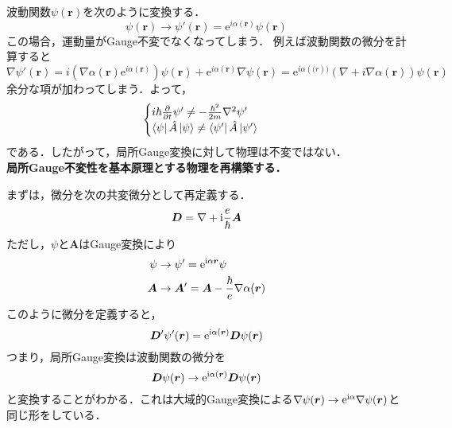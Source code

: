 \documentclass{report}
\begin{document}
  波動関数$\psi(\bm{r})$を次のように変換する．
  \begin{equation}
    \psi(\bm{r})\to\psi'(\bm{r})=\mathrm{e}^{i\alpha(\bm{r})}\psi(\bm{r})
  \end{equation}
  この場合，運動量がGauge不変でなくなってしまう．
  例えば波動関数の微分を計算すると
  \begin{equation}
    \nabla\psi'(\bm{r})=i(\nabla\alpha(\bm{r})\mathrm{e}^{i\alpha(\bm{r})})\psi(\bm{r})+\mathrm{e}^{i\alpha(\bm{r})}\nabla\psi(\bm{r})=\mathrm{e}^{i\alpha(\bm(r))}(\nabla+i\nabla\alpha(\bm{r}))\psi(\bm{r}) 
  \end{equation}
  余分な項が加わってしまう．よって，
  \begin{equation}
    \begin{cases}
      i\hbar\frac{\partial}{\partial t}\psi'\ne -\frac{\hbar^2}{2m}\nabla^2\psi'\\
      \bra{\psi}\hat{A}\ket{\psi}\ne\bra{\psi'}\hat{A}\ket{\psi'}
    \end{cases}
  \end{equation}
  である．したがって，局所Gauge変換に対して物理は不変ではない．\\
  \textbf{局所Gauge不変性を基本原理とする物理を再構築する．}

  まずは，微分を次の共変微分として再定義する．
  \begin{equation}
    \bm{D}=\nabla+\mathrm{i}\frac{e}{\hbar}\bm{A}
  \end{equation}
  ただし，$\psi$と$\bm{A}$はGauge変換により
  \begin{align}
    \psi&\to\psi'=\mathrm{e}^{\mathrm{i}\alpha{\bm{r}}}\psi\\
    \bm{A}&\to\bm{A}'=\bm{A}-\frac{\hbar}{e}\nabla\alpha(\bm{r})
  \end{align}
  このように微分を定義すると，
  \begin{equation}
    \bm{D}'\psi'(\bm{r})=\mathrm{e}^{\mathrm{i}\alpha(\bm{r})}\bm{D}\psi(\bm{r})
  \end{equation}
  つまり，局所Gauge変換は波動関数の微分を
  \begin{equation}
    \bm{D}\psi(\bm{r})\to\mathrm{e}^{\mathrm{i}\alpha(\bm{r})}\bm{D}\psi(\bm{r})
  \end{equation}
  と変換することがわかる．これは大域的Gauge変換による$\nabla\psi(\bm{r})\to\mathrm{e}^{\mathrm{i}\alpha}\nabla\psi(\bm{r})$と同じ形をしている．
\end{document}

